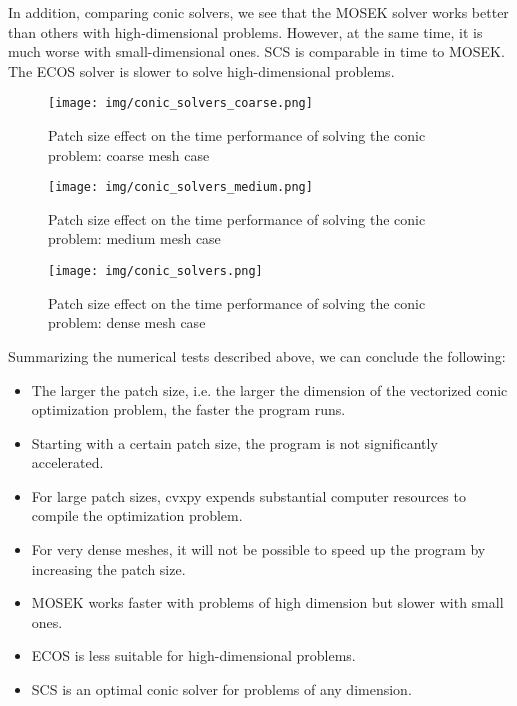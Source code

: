 \documentclass[12pt]{article}
\begin{document}
In addition, comparing conic solvers, we see that the MOSEK solver works better than others with high-dimensional problems. However, at the same time, it is much worse with small-dimensional ones. SCS is comparable in time to MOSEK. The ECOS solver is slower to solve high-dimensional problems.

\begin{figure}[H]
    \center
    \texttt{[image: img/conic\_solvers\_coarse.png]}
    \caption{Patch size effect on the time performance of solving the conic problem: coarse mesh case}
    \label{fig:conic_solvers_coarse}
\end{figure}

\begin{figure}[H]
    \center
    \texttt{[image: img/conic\_solvers\_medium.png]}
    \caption{Patch size effect on the time performance of solving the conic problem: medium mesh case}
    \label{fig:conic_solvers_medium}
\end{figure}

\begin{figure}[H]
    \center
    \texttt{[image: img/conic\_solvers.png]}
    \caption{Patch size effect on the time performance of solving the conic problem: dense mesh case}
    \label{fig:conic_solvers_dense}
\end{figure}

Summarizing the numerical tests described above, we can conclude the following:
\begin{itemize}
    \item The larger the patch size, i.e. the larger the dimension of the vectorized conic optimization problem, the faster the program runs.
    \item Starting with a certain patch size, the program is not significantly accelerated.
    \item For large patch sizes, cvxpy expends substantial computer resources to compile the optimization problem.
    \item For very dense meshes, it will not be possible to speed up the program by increasing the patch size.
    \item MOSEK works faster with problems of high dimension but slower with small ones.
    \item ECOS is less suitable for high-dimensional problems.
    \item SCS is an optimal conic solver for problems of any dimension.
\end{itemize}
\end{document}
